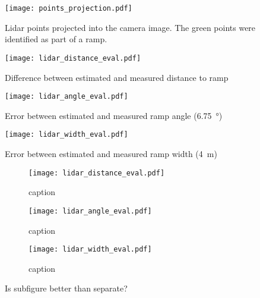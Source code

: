 \begin{figure}[htbp]
    \centering
    \texttt{[image: points\_projection.pdf]}
    \caption{Lidar points projected into the camera image. The green points were identified as part of a ramp.}
\end{figure}
\newpage
\begin{figure}[htbp]
    \centering
    \texttt{[image: lidar\_distance\_eval.pdf]}
    \caption{Difference between estimated and measured distance to ramp}
    \label{fig:lidar_distance_eval}
\end{figure}
\begin{figure}[htbp]
    \centering
    \texttt{[image: lidar\_angle\_eval.pdf]}
    \caption{Error between estimated and measured ramp angle (\SI{6.75}{\degree})}
    \label{fig:lidar_angle_eval}
\end{figure}
\begin{figure}[htbp]
    \centering
    \texttt{[image: lidar\_width\_eval.pdf]}
    \caption{Error between estimated and measured ramp width (\SI{4}{\metre})}
    \label{fig:lidar_width_eval}
\end{figure}

\begin{figure}[htb]
    \centering
    \begin{subfigure}{1\textwidth}
        \centering
        \texttt{[image: lidar\_distance\_eval.pdf]}
        \caption{caption}
        \label{fig:lidar_distance_evalTest}
    \end{subfigure}
    
    \begin{subfigure}{1\textwidth}
        \centering
        \texttt{[image: lidar\_angle\_eval.pdf]}
        \caption{caption}
        \label{fig:lidar_angle_evalTest}
    \end{subfigure}
    
    \begin{subfigure}{1\textwidth}
        \centering
        \texttt{[image: lidar\_width\_eval.pdf]}
        \caption{caption}
        \label{fig:lidar_width_evalTest}
    \end{subfigure}
    \caption{Is subfigure better than separate?}
    \label{fig:subFigTest}
\end{figure}